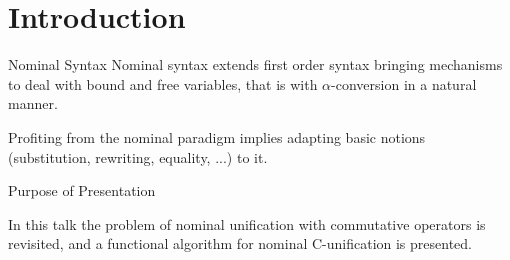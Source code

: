 \section{Introduction}

\begin{frame}{Nominal Syntax}
    Nominal syntax extends first order syntax bringing mechanisms to deal with bound
    and free variables, that is with $\alpha$-conversion in a natural manner.
    \par Profiting from the nominal paradigm implies adapting basic notions 
    (substitution, rewriting, equality, ...) to it.
\end{frame}

\begin{frame}{Purpose of Presentation}
    \par In this talk the problem of nominal unification with commutative operators
    is revisited, and a functional algorithm for nominal C-unification is presented. 
\end{frame}

